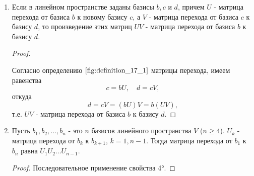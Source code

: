 \begin{enumerate}[label={\arabic*°.}]
    \item Если в линейном пространстве заданы базисы $b, c$ и $d$, причем $U$ - матрица перехода от базиса $b$ к новому базису $c$, а $V$ - матрица перехода от базиса $c$ к базису $d$, то произведение этих матриц $UV$ - матрица перехода от базиса $b$ к базису $d$.
    \begin{proof}~

        Согласно определению $\eqref{fig:definition_17_1}$ матрицы перехода, имеем равенства
        $$c = bU, \quad d = cV,$$
        откуда
        $$d = cV = (bU)V = b(UV),$$
        т.е. $UV$ - матрица перехода от базиса $b$ к базису $d$.
    \end{proof}

    \item Пусть $b_1, b_2, \ldots, b_n$ - это $n$ базисов линейного пространства $V$ ($n \geq 4$). $U_k$ - матрица перехода от $b_k$ к $b_{k + 1}$, $k = \overline{1, n - 1}$. Тогда матрица перехода от $b_1$ к $b_n$ равна $U_1U_2 \ldots U_{n - 1}$.
    \begin{proof}
        Последовательное применение свойства 4°.
    \end{proof}
\end{enumerate}

